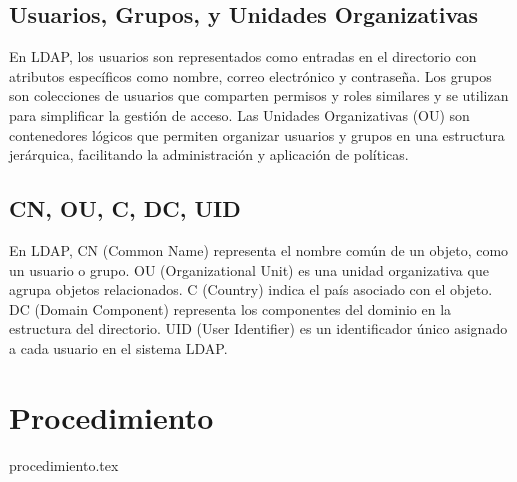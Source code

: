 \documentclass[a4paper,twoside,draft,onecolumn]{article}
\begin{document}
\subsection{Usuarios, Grupos, y Unidades Organizativas}
En LDAP, los usuarios son representados como entradas en el directorio con atributos específicos como nombre, correo electrónico y contraseña. Los grupos son colecciones de usuarios que comparten permisos y roles similares
y se utilizan para simplificar la gestión de acceso. Las Unidades Organizativas (OU) son contenedores lógicos que permiten organizar usuarios y grupos en una estructura jerárquica, facilitando la administración y aplicación de políticas.
\subsection{CN, OU, C, DC, UID }
En LDAP, CN (Common Name) representa el nombre común de un objeto, como un usuario o grupo. OU (Organizational Unit) es una unidad organizativa que agrupa objetos relacionados. C (Country) indica el país asociado con el objeto. DC (Domain Component) representa los componentes del dominio en la estructura del directorio. UID (User Identifier) es un identificador único asignado a cada usuario en el sistema LDAP.

\section{Procedimiento}
{procedimiento.tex}
\end{document}

